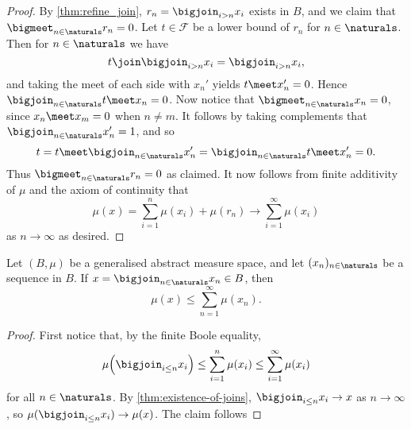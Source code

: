 \documentclass[article, a4paper, 11pt, oneside]{memoir}
\numberwithin{equation}{chapter}
\newcommand{\calF}{\mathcal{F}}
\begin{document}
\begin{proof}
    By \cref{thm:refine_join}, $r_n = \bigjoin_{i > n} x_i$ exists in $B$, and we claim that $\bigmeet_{n\in\naturals} r_n = 0$. Let $t \in \calF$ be a lower bound of $r_n$ for $n \in \naturals$. Then for $n \in \naturals$ we have
    \begin{equation*}
        t \join \bigjoin_{i > n} x_i
            = \bigjoin_{i > n} x_i,
    \end{equation*}
    and taking the meet of each side with $x_n'$ yields $t \meet x_n' = 0$. Hence $\bigjoin_{n\in\naturals} t \meet x_n = 0$. Now notice that $\bigmeet_{n\in\naturals} x_n = 0$, since $x_n \meet x_m = 0$ when $n \neq m$. It follows by taking complements that $\bigjoin_{n\in\naturals} x_n' = 1$, and so
    \begin{equation*}
        t
            = t \meet \bigjoin_{n\in\naturals} x_n'
            = \bigjoin_{n\in\naturals} t \meet x_n'
            = 0.
    \end{equation*}
    Thus $\bigmeet_{n\in\naturals} r_n = 0$ as claimed. It now follows from finite additivity of $\mu$ and the axiom of continuity that
    \begin{equation*}
        \mu(x)
            = \sum_{i=1}^n \mu(x_i) + \mu(r_n)
            \to \sum_{i=1}^\infty \mu(x_i)
    \end{equation*}
    as $n \to \infty$ as desired.
\end{proof}


\begin{proposition}
    Let $(B,\mu)$ be a generalised abstract measure space, and let $(x_n)_{n\in\naturals}$ be a sequence in $B$. If $x = \bigjoin_{n\in\naturals} x_n \in B$, then
    \begin{equation*}
        \mu(x)
            \leq \sum_{n=1}^\infty \mu(x_n).
    \end{equation*}
\end{proposition}

\begin{proof}
    First notice that, by the finite Boole equality,
    \begin{equation*}
        \mu \Bigl( \bigjoin_{i \leq n} x_i \Bigr)
            \leq \sum_{i=1}^n \mu(x_i)
            \leq \sum_{i=1}^\infty \mu(x_i)
    \end{equation*}
    for all $n \in \naturals$. By \cref{thm:existence-of-joins}, $\bigjoin_{i \leq n} x_i \to x$ as $n \to \infty$, so $\mu( \bigjoin_{i \leq n} x_i ) \to \mu(x)$. The claim follows
\end{proof}
\end{document}
